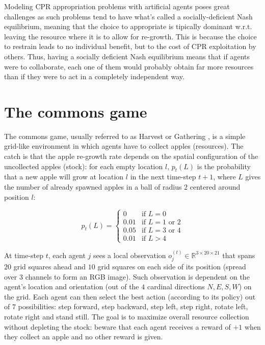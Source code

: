 \documentclass{article}
\begin{document}
Modeling CPR appropriation problems with artificial agents poses great challenges as such problems tend to have what's called a socially-deficient Nash equilibrium, meaning that the choice to appropriate is tipically dominant w.r.t. leaving the resource where it is to allow for re-growth. This is because the choice to restrain leads to no individual benefit, but to the cost of CPR exploitation by others. Thus, having a socially deficient Nash equilibrium means that if agents were to collaborate, each one of them would probably obtain far more resources than if they were to act in a completely independent way.

\section{The commons game}
The commons game, usually referred to as Harvest \cite{harvest} or Gathering \cite{sequential-social-dilemmas}, is a simple grid-like environment in which agents have to collect apples (resources). The catch is that the apple re-growth rate depends on the spatial configuration of the uncollected apples (stock): for each empty location $l$, $p_t(L)$ is the probability that a new apple will grow at location $l$ in the next time-step $t+1$, where $L$ gives the number of already spawned apples in a ball of radius $2$ centered around position $l$: 

\[
  p_t(L)= 
  \begin{cases} 
    0 & \text{if } L = 0 \\
    0.01 & \text{if } L = 1 \text{ or } 2 \\
    0.05 & \text{if } L = 3 \text{ or } 4 \\
    0.01 & \text{if } L > 4 
  \end{cases}
\]

At time-step $t$, each agent $j$ sees a local observation $o_j^{(t)}\in\mathbb{R}^{3\times20\times21}$ that spans $20$ grid squares ahead and $10$ grid squares on each side of its position (spread over $3$ channels to form an RGB image). Such observation is dependent on the agent's location and orientation (out of the $4$ cardinal directions $N, E, S, W$) on the grid. Each agent can then select the best action (according to its policy) out of $7$ possibilities: step forward, step backward, step left, step right, rotate left, rotate right and stand still. The goal is to maximize overall resource collection without depleting the stock: beware that each agent receives a reward of $+1$ when they collect an apple and no other reward is given.
\end{document}

